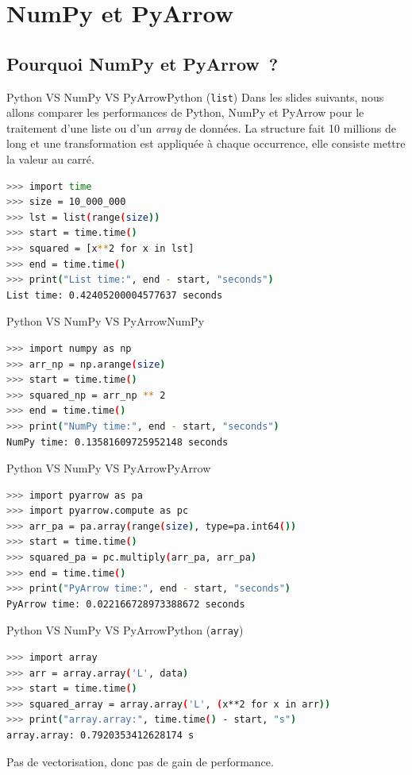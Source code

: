 \documentclass{beamer}
\begin{document}
    \section{NumPy et PyArrow}

    \subsection{Pourquoi NumPy et PyArrow~?}
    \begin{frame}[fragile]{Python VS NumPy VS PyArrow}{Python (\lstinline{list})}
        Dans les slides suivants, nous allons comparer les performances de Python, NumPy et PyArrow pour le traitement d'une liste ou d'un \textit{array} de données.
        La structure fait 10 millions de long et une transformation est appliquée à chaque occurrence, elle consiste mettre la valeur au carré.
        \begin{lstlisting}[language=bash]
>>> import time
>>> size = 10_000_000
>>> lst = list(range(size))
>>> start = time.time()
>>> squared = [x**2 for x in lst]
>>> end = time.time()
>>> print("List time:", end - start, "seconds")
List time: 0.42405200004577637 seconds
        \end{lstlisting}
    \end{frame}

    \begin{frame}[fragile]{Python VS NumPy VS PyArrow}{NumPy}
        \begin{lstlisting}[language=bash]
>>> import numpy as np
>>> arr_np = np.arange(size)
>>> start = time.time()
>>> squared_np = arr_np ** 2
>>> end = time.time()
>>> print("NumPy time:", end - start, "seconds")
NumPy time: 0.13581609725952148 seconds
        \end{lstlisting}
    \end{frame}

    \begin{frame}[fragile]{Python VS NumPy VS PyArrow}{PyArrow}
        \begin{lstlisting}[language=bash]
>>> import pyarrow as pa
>>> import pyarrow.compute as pc
>>> arr_pa = pa.array(range(size), type=pa.int64())
>>> start = time.time()
>>> squared_pa = pc.multiply(arr_pa, arr_pa)
>>> end = time.time()
>>> print("PyArrow time:", end - start, "seconds")
PyArrow time: 0.022166728973388672 seconds
        \end{lstlisting}
    \end{frame}

    \begin{frame}[fragile]{Python VS NumPy VS PyArrow}{Python (\lstinline{array})}
        \begin{lstlisting}[language=bash]
>>> import array
>>> arr = array.array('L', data)
>>> start = time.time()
>>> squared_array = array.array('L', (x**2 for x in arr))
>>> print("array.array:", time.time() - start, "s")
array.array: 0.7920353412628174 s
        \end{lstlisting}
        \begin{dangercolorbox}
            Pas de vectorisation, donc pas de gain de performance.
        \end{dangercolorbox}
    \end{frame}
\end{document}
